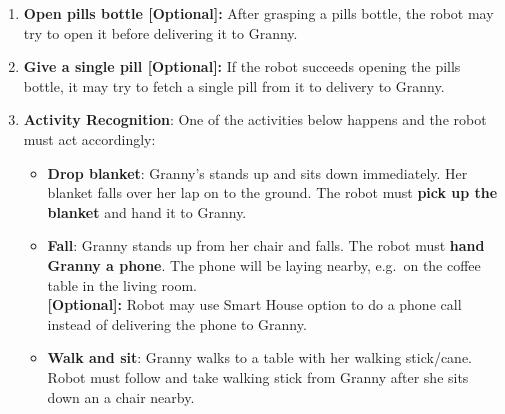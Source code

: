 \begin{enumerate}
 	\item \textbf{Open pills bottle [Optional]:} After grasping a pills bottle, the robot may try to open it before delivering it to Granny.

 	\item \textbf{Give a single pill [Optional]:} If the robot succeeds opening the pills bottle, it may try to fetch a single pill from it to delivery to Granny.

 	\item \textbf{Activity Recognition}: One of the activities below happens and the robot must act accordingly:
 	\begin{itemize}
 		\item \textbf{Drop blanket}: Granny's stands up and sits down immediately. Her blanket falls over her lap on to the ground. The robot must \textbf{pick up the blanket} and hand it to Granny.

 		\item \textbf{Fall}: Granny stands up from her chair and falls. The robot must \textbf{hand Granny a phone}. The phone will be laying nearby, e.g.~on the coffee table in the living room. \\
		\textbf{[Optional]:} Robot may use Smart House option to do a phone call instead of delivering the phone to Granny.

 		\item \textbf{Walk and sit}: Granny walks to a table with her walking stick/cane. Robot must follow and take walking stick from Granny after she sits down an a chair nearby.
 	\end{itemize}
\end{enumerate}


